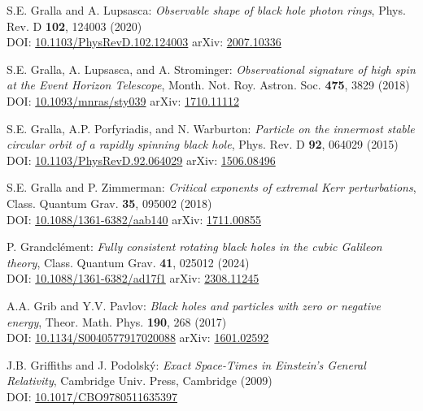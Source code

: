 \begin{thebibliography}{123}
S.E. Gralla and A. Lupsasca:
{\em Observable shape of black hole photon rings},
Phys. Rev. D {\bf 102}, 124003 (2020)\\
DOI: \href{https://doi.org/10.1103/PhysRevD.102.124003}{10.1103/PhysRevD.102.124003}\hfill
arXiv: \href{https://arxiv.org/abs/2007.10336}{2007.10336}

S.E. Gralla, A. Lupsasca, and A. Strominger:
{\em Observational signature of high spin at the Event Horizon Telescope},
Month. Not. Roy. Astron. Soc. {\bf 475}, 3829 (2018)\\
DOI: \href{https://doi.org/10.1093/mnras/sty039}{10.1093/mnras/sty039}\hfill
arXiv: \href{https://arxiv.org/abs/1710.11112}{1710.11112}

S.E. Gralla, A.P. Porfyriadis, and N. Warburton:
{\em Particle on the innermost stable circular orbit of a rapidly spinning black hole},
Phys. Rev. D {\bf 92}, 064029 (2015)\\
DOI: \href{https://doi.org/10.1103/PhysRevD.92.064029}{10.1103/PhysRevD.92.064029}\hfill
arXiv: \href{https://arxiv.org/abs/1506.08496}{1506.08496}

S.E. Gralla and P. Zimmerman:
{\em Critical exponents of extremal Kerr perturbations},
Class. Quantum Grav. {\bf 35}, 095002 (2018)\\
DOI: \href{https://doi.org/10.1088/1361-6382/aab140}{10.1088/1361-6382/aab140}\hfill
arXiv: \href{https://arxiv.org/abs/1711.00855}{1711.00855}

P. Grandclément:
{\em Fully consistent rotating black holes in the cubic Galileon theory},
Class. Quantum Grav. {\bf 41}, 025012 (2024)\\
DOI: \href{https://doi.org/10.1088/1361-6382/ad17f1}{10.1088/1361-6382/ad17f1}\hfill
arXiv: \href{https://arxiv.org/abs/2308.11245}{2308.11245}

A.A. Grib and Y.V. Pavlov:
{\em Black holes and particles with zero or negative energy},
Theor. Math. Phys. {\bf 190}, 268 (2017)\\
DOI: \href{https://doi.org/10.1134/S0040577917020088}{10.1134/S0040577917020088}\hfill
arXiv: \href{https://arxiv.org/abs/1601.02592}{1601.02592}

J.B. Griffiths and J. Podolský:
{\em Exact Space-Times in Einstein's General Relativity},
Cambridge Univ. Press, Cambridge (2009)\\
DOI: \href{https://doi.org/10.1017/CBO9780511635397}{10.1017/CBO9780511635397}


\end{thebibliography}

